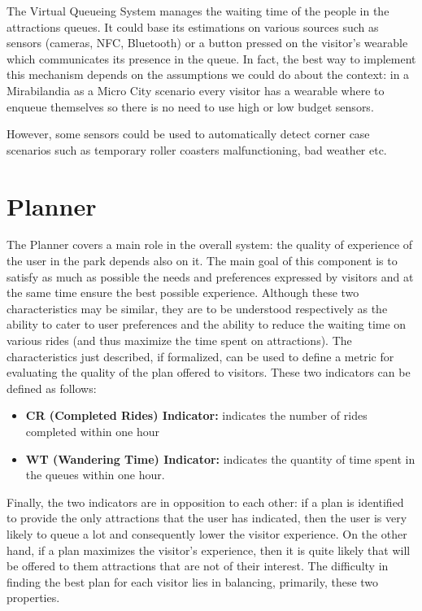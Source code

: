 The Virtual Queueing System manages the waiting time of the people in the attractions queues.
It could base its estimations on various sources such as sensors (cameras, NFC, Bluetooth) or
a button pressed on the visitor's wearable which communicates its presence in the queue.
In fact, the best way to implement this mechanism depends on the assumptions we could do about the context: in a Mirabilandia as a Micro City scenario every visitor has a wearable where to enqueue themselves so there is no need to use high or low budget sensors.

However, some sensors could be used to automatically detect corner case scenarios such as temporary roller coasters malfunctioning, bad weather etc.

\section{Planner}

The Planner covers a main role in the overall system: the quality of experience of the user in the park depends also on it.
The main goal of this component is to satisfy as much as possible the needs and preferences expressed by visitors and at the same time ensure the
best possible experience.
Although these two characteristics may be similar, they are to be understood respectively as the ability to cater to user preferences and the
ability to reduce the waiting time on various rides (and thus maximize the time spent on attractions).
The characteristics just described, if formalized, can be used to define a metric for evaluating the quality of the plan offered to visitors.
These two indicators can be defined as follows:

\begin{itemize}
	\item \textbf{CR (Completed Rides) Indicator:} indicates the number of rides completed within one hour
	\item \textbf{WT (Wandering Time) Indicator:} indicates the quantity of time spent in the queues within one hour.
\end{itemize}


Finally, the two indicators are in opposition to each other: if a plan is identified to provide the only attractions that
the user has indicated, then the user is very likely to queue a lot and consequently lower the visitor experience.
On the other hand, if a plan maximizes the visitor's experience, then it is quite likely that will be offered to them attractions that are not of
their interest.
The difficulty in finding the best plan for each visitor lies in balancing, primarily, these two properties.

